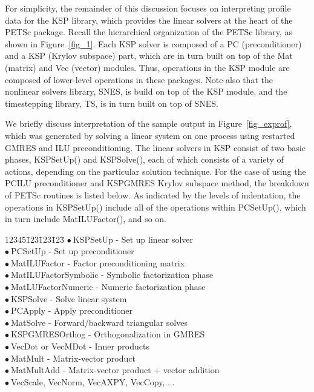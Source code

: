 For simplicity, the remainder of this discussion focuses on
interpreting profile data for the KSP library, 
which provides the linear solvers at the heart of the
PETSc package.  Recall the hierarchical organization of the PETSc
library, as shown in Figure~\ref{fig_1}.  Each KSP solver 
is composed of a PC (preconditioner) and a KSP (Krylov
subspace) part, which are in turn built on top of the Mat 
(matrix) and Vec (vector) modules.  Thus, operations in the
KSP module are composed of lower-level operations in these
packages.  Note also that the nonlinear solvers library, SNES, 
is build on top of the KSP module, and the timestepping
library, TS, is in turn built on top of SNES.

We briefly discuss interpretation of the sample output in
Figure~\ref{fig_exprof}, which was generated by solving a linear
system on one process using restarted GMRES and ILU
preconditioning.  The linear solvers in KSP consist of two
basic phases, KSPSetUp() and KSPSolve(), each of which
consists of a variety of actions, depending on the particular
solution technique.
For the case of using the PCILU preconditioner and KSPGMRES
Krylov subspace method, the breakdown of PETSc routines is listed below.
As indicated by the levels of indentation, the
operations in KSPSetUp() include all of the operations within
PCSetUp(), which in turn include MatILUFactor(), and so on. 
\newcommand{\bu}{$\bullet \: $}
\begin{tabbing}
12345\=123\=123\=123\= \kill
\> \bu KSPSetUp - Set up linear solver\\
\>\> \bu PCSetUp - Set up preconditioner\\
\>\>\> \bu MatILUFactor - Factor preconditioning matrix\\
\>\>\>\> \bu MatILUFactorSymbolic - Symbolic factorization phase\\
\>\>\>\> \bu MatLUFactorNumeric - Numeric factorization phase\\
\> \bu KSPSolve - Solve linear system\\
\>\> \bu PCApply - Apply preconditioner\\
\>\>\> \bu MatSolve - Forward/backward triangular solves\\
\>\> \bu KSPGMRESOrthog - Orthogonalization in GMRES\\
\>\>\> \bu VecDot or VecMDot - Inner products\\
\>\> \bu MatMult - Matrix-vector product\\
\>\> \bu MatMultAdd - Matrix-vector product + vector addition\\
\>\> \bu  VecScale, VecNorm, VecAXPY, VecCopy, ...\\
\end{tabbing}

